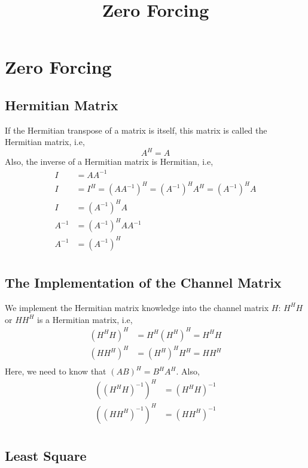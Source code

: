 \documentclass{article}
\title{Zero Forcing}
\author{}
\date{}
\begin{document}
\maketitle
\section{Zero Forcing}
\subsection{Hermitian Matrix}
If the Hermitian transpose of a matrix is itself, this matrix is called the Hermitian matrix, i.e,
\begin{equation}
A^H = A
\end{equation}
Also, the inverse of a Hermitian matrix is Hermitian, i.e,
\begin{equation}
\begin{split}
I &= AA^{-1} \\
I &= I^H = (AA^{-1})^H = (A^{-1})^HA^H = (A^{-1})^HA \\
I &= (A^{-1})^HA \\
A^{-1} &= (A^{-1})^HAA^{-1} \\ 
A^{-1} &= (A^{-1})^H \\ 
\end{split}
\end{equation}
\subsection{The Implementation of the Channel Matrix}
We implement the Hermitian matrix knowledge into the channel matrix $H$: $H^HH$ or $HH^H$ is a Hermitian matrix, i.e,
\begin{equation}
\begin{split}
(H^HH)^H &= H^H(H^H)^H=H^HH \\
(HH^H)^H &= (H^H)^HH^H=HH^H \\
\end{split}
\end{equation}
Here, we need to know that $(AB)^H=B^HA^H$.
Also, 
\begin{equation}
\begin{split}
((H^HH)^{-1})^H &= (H^HH)^{-1} \\
((HH^H)^{-1})^H &= (HH^H)^{-1} \\
\end{split}
\end{equation}

\subsection{Least Square}
\end{document}

